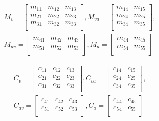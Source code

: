 \documentclass{article}
\begin{document}
\begin{equation}
	\begin{aligned}
	M_v = 
	\begin{bmatrix}
		m_{11}& m_{12}& m_{13} \\
		m_{21}& m_{22}& m_{23} \\
		m_{31}& m_{32}& m_{33} \\
	\end{bmatrix},		M_{va} = 
	\begin{bmatrix}
		m_{14}& m_{15} \\
		m_{24}& m_{25} \\
		m_{34}& m_{35} \\
	\end{bmatrix}, \\
	M_{av} = 
	\begin{bmatrix}
		m_{41}& m_{42}& m_{43} \\
		m_{51}& m_{52}& m_{53} \\
	\end{bmatrix}, 	M_{a} = 
	\begin{bmatrix}
		m_{44}& m_{45} \\
		m_{54}& m_{55} \\
	\end{bmatrix}
	\end{aligned}
\end{equation}

\begin{equation}
	\begin{aligned}
		C_v = 
		\begin{bmatrix}
			c_{11} &c_{12} &c_{13} \\
			c_{21} &c_{22} &c_{23}   \\
			c_{31} &c_{32} &c_{33}   \\
		\end{bmatrix},			C_{va} = 
		\begin{bmatrix}
			c_{14}& c_{15} \\
			c_{24}& c_{25} \\
			c_{34}& c_{35} \\
		\end{bmatrix}, \\
		C_{av} = 
		\begin{bmatrix}
			c_{41}& c_{42}& c_{43} \\
			c_{51}& c_{52}& c_{53} \\
		\end{bmatrix}, 		C_{a} = 
		\begin{bmatrix}
			c_{44}& c_{45} \\
			c_{54}& c_{55} \\
		\end{bmatrix}
	\end{aligned}
\end{equation}
\end{document}
